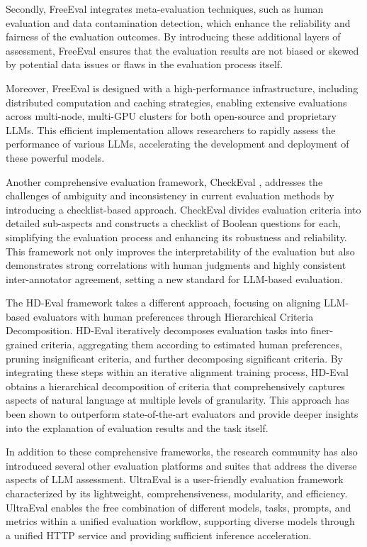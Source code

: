 \documentclass[11pt]{article}
\begin{document}
Secondly, FreeEval integrates meta-evaluation techniques, such as human evaluation and data contamination detection, which enhance the reliability and fairness of the evaluation outcomes. By introducing these additional layers of assessment, FreeEval ensures that the evaluation results are not biased or skewed by potential data issues or flaws in the evaluation process itself.

Moreover, FreeEval is designed with a high-performance infrastructure, including distributed computation and caching strategies, enabling extensive evaluations across multi-node, multi-GPU clusters for both open-source and proprietary LLMs. This efficient implementation allows researchers to rapidly assess the performance of various LLMs, accelerating the development and deployment of these powerful models.

Another comprehensive evaluation framework, CheckEval \cite{ref77}, addresses the challenges of ambiguity and inconsistency in current evaluation methods by introducing a checklist-based approach. CheckEval divides evaluation criteria into detailed sub-aspects and constructs a checklist of Boolean questions for each, simplifying the evaluation process and enhancing its robustness and reliability. This framework not only improves the interpretability of the evaluation but also demonstrates strong correlations with human judgments and highly consistent inter-annotator agreement, setting a new standard for LLM-based evaluation.

The HD-Eval \cite{ref78} framework takes a different approach, focusing on aligning LLM-based evaluators with human preferences through Hierarchical Criteria Decomposition. HD-Eval iteratively decomposes evaluation tasks into finer-grained criteria, aggregating them according to estimated human preferences, pruning insignificant criteria, and further decomposing significant criteria. By integrating these steps within an iterative alignment training process, HD-Eval obtains a hierarchical decomposition of criteria that comprehensively captures aspects of natural language at multiple levels of granularity. This approach has been shown to outperform state-of-the-art evaluators and provide deeper insights into the explanation of evaluation results and the task itself.

In addition to these comprehensive frameworks, the research community has also introduced several other evaluation platforms and suites that address the diverse aspects of LLM assessment. UltraEval \cite{ref79} is a user-friendly evaluation framework characterized by its lightweight, comprehensiveness, modularity, and efficiency. UltraEval enables the free combination of different models, tasks, prompts, and metrics within a unified evaluation workflow, supporting diverse models through a unified HTTP service and providing sufficient inference acceleration.
\end{document}
